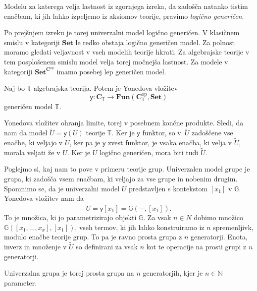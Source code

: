 \documentclass[../kategoricna_logika.tex]{subfiles}
\begin{document}
\begin{definicija}
  Modelu za katerega velja lastnost iz zgornjega izreka, da zadošča
  natanko tistim enačbam, ki jih lahko izpeljemo iz aksiomov teorije,
  pravimo \emph{logično generičen}.
\end{definicija}
Po prejšnjem izreku je torej univerzalni model logično generičen.
V klasičnem smislu v kategoriji $\mathbf{Set}$ le redko obstaja
logično generičen model. Za polnost moramo gledati veljavnost
v vseh modelih teorije hkrati. Za algebrajske teorije v tem posplošenem
smislu model velja torej močnejša lastnost.
Za modele v kategoriji $\mathbf{Set}^{\mathbf{C}^{\mathrm{op}}}$
imamo posebej lep generičen model.
\begin{trditev}
  Naj bo $\mathbb{T}$ algebrajska teorija. Potem je Yonedova vložitev
  \[ \mathsf{y} : \mathbf{C}_{\mathbb{T}} \to \mathbf{Fun}(\mathbf{C}_{\mathbb{T}}^{\mathrm{op}}, \mathbf{Set}) \]
  generičen model $\mathbb{T}$.
\end{trditev}
\begin{dokaz}
  Yonedova vložitev ohranja limite, torej v posebnem končne produkte.
  Sledi, da nam da model $\tilde{U} = \mathsf{y}(U)$ teorije $\mathbb{T}$.
  Ker je $\mathsf{y}$ funktor, so v~$\tilde{U}$ zadoščene vse enačbe,
  ki veljajo v $U$, ker pa je $\mathsf{y}$ zvest funktor, je vsaka enačba,
  ki velja v $\tilde{U}$, morala veljati že v $U$.
  Ker je $U$ logično generičen, mora biti tudi $\tilde{U}$.
\end{dokaz}
\begin{primer}
  Poglejmo si, kaj nam to pove v primeru teorije grup. Univerzalen model
  grupe je grupa, ki zadošča vsem enačbam, ki veljajo za vse grupe
  in nobenim drugim. Spomnimo se, da je univerzalni model $U$
  predstavljen s kontekstom $[x_1]$ v $\mathbb{G}$.
  Yonedova vložitev nam da
  \[ \tilde{U} = \mathsf{y}[x_1] = \mathbb{G}(-, [x_1]). \]
  To je množica, ki jo parametrizirajo objekti $\mathbb{G}$.
  Za vsak $n \in \mathbb{}N$ dobimo množico $\mathbb{G}([x_1, \ldots, x_x], [x_1])$,
  vseh termov, ki jih lahko konstruiramo iz $n$ spremenljivk,
  modulo enačbe teorije grup.
  To pa je ravno prosta grupa z $n$ generatorji. Enota, inverz in množenje
  v $\tilde{U}$ so definirani za vsak $n$ kot te operacije na
  prosti grupi z $n$ generatorji.

  Univerzalna grupa je torej prosta grupa na $n$ generatorjih,
  kjer je $n \in \mathbb{N}$ parameter.
\end{primer}
%
\end{document}
